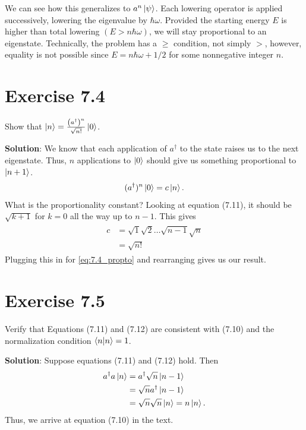 \documentclass{book}
\begin{document}
    We can see how this generalizes to $a^n \ket{\psi}$. Each lowering operator is applied successively, lowering the eigenvalue by $\hbar \omega$. Provided the starting energy $E$ is higher than total lowering $(E > n \hbar \omega)$, we will stay proportional to an eigenstate. Technically, the problem has a $\geq$ condition, not simply $>$, however, equality is not possible since $E = n\hbar \omega + 1/2$ for some nonnegative integer $n$.

\section*{Exercise 7.4}
    Show that $\ket{n} = \frac{\left(a^\dagger\right)^n}{\sqrt{n!}} \ket{0}$.

    \textbf{Solution}: We know that each application of $a^\dagger$ to the state raises us to the next eigenstate. Thus, $n$ applications to $\ket{0}$ should give us something proportional to $\ket{n+1}$.
    \begin{align} \label{eq:7.4_propto}
        (a^\dagger)^n \ket{0} = c \ket{n}.
    \end{align}
    What is the proportionality constant? Looking at equation (7.11), it should be $\sqrt{k+1}$ for $k = 0$ all the way up to $n-1$. This gives
    \begin{align}
    \begin{aligned}
        c &= \sqrt{1}\sqrt{2} \dots \sqrt{n-1} \sqrt{n} \\
        &= \sqrt{n!}
    \end{aligned}
    \end{align}
    Plugging this in for \eqref{eq:7.4_propto} and rearranging gives us our result.

\section*{Exercise 7.5}
    Verify that Equations (7.11) and (7.12) are consistent with (7.10) and the normalization condition $\bra{n}\ket{n} = 1$.

    \textbf{Solution}: Suppose equations (7.11) and (7.12) hold. Then
    \begin{align}
    \begin{aligned}
        a^\dagger a \ket{n} &= a^\dagger \sqrt{n}\ket{n-1} \\
        &= \sqrt{n} a^\dagger \ket{n-1} \\
        &= \sqrt{n} \sqrt{n} \ket{n} = n \ket{n}.
    \end{aligned}
    \end{align}
    Thus, we arrive at equation (7.10) in the text.
    
\end{document}
